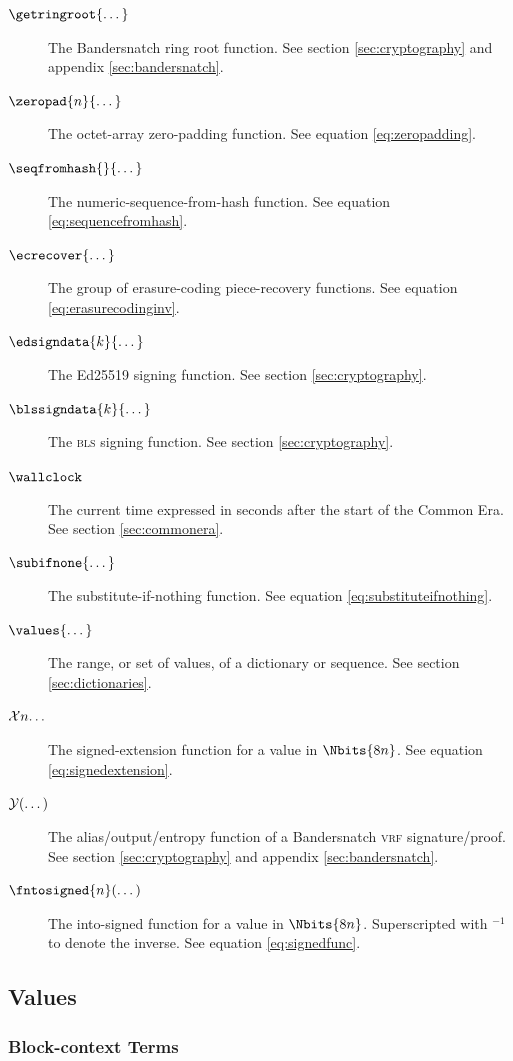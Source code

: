 \begin{description}
  \item[$\getringroot{\dots}$] The Bandersnatch ring root function. See section \ref{sec:cryptography} and appendix \ref{sec:bandersnatch}.
  \item[$\zeropad{n}{\dots}$] The octet-array zero-padding function. See equation \ref{eq:zeropadding}.
  \item[$\seqfromhash{}{\dots}$] The numeric-sequence-from-hash function. See equation \ref{eq:sequencefromhash}.
  \item[$\ecrecover{\dots}$] The group of erasure-coding piece-recovery functions. See equation \ref{eq:erasurecodinginv}.
  \item[$\edsigndata{k}{\dots}$] The Ed25519 signing function. See section \ref{sec:cryptography}.
  \item[$\blssigndata{k}{\dots}$] The \textsc{bls} signing function. See section \ref{sec:cryptography}.
  \item[$\wallclock$] The current time expressed in seconds after the start of the \Jam Common Era. See section \ref{sec:commonera}.
  \item[$\subifnone{\dots}$] The substitute-if-nothing function. See equation \ref{eq:substituteifnothing}.
  \item[$\values{\dots}$] The range, or set of values, of a dictionary or sequence. See section \ref{sec:dictionaries}.
  \item[$\mathcal{X}{n}{\dots}$] The signed-extension function for a value in $\Nbits{8n}$. See equation \ref{eq:signedextension}.
  \item[$\mathcal{Y}(\dots)$] The alias/output/entropy function of a Bandersnatch \textsc{vrf} signature/proof. See section \ref{sec:cryptography} and appendix \ref{sec:bandersnatch}.
  \item[$\fntosigned{n}(\dots)$] The into-signed function for a value in $\Nbits{8n}$. Superscripted with ${}^{-1}$ to denote the inverse. See equation \ref{eq:signedfunc}.
\end{description}

\subsection{Values}

\subsubsection{Block-context Terms}

